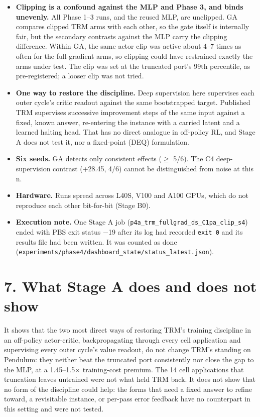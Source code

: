 \documentclass[11pt]{article}
\begin{document}
\begin{itemize}
\item \textbf{Clipping is a confound against the MLP and Phase 3, and binds unevenly.} All Phase 1--3 runs, and the reused MLP, are unclipped. GA compares clipped TRM arms with each other, so the gate itself is internally fair, but the secondary contrasts against the MLP carry the clipping difference. Within GA, the same actor clip was active about 4--7 times as often for the full-gradient arms, so clipping could have restrained exactly the arms under test. The clip was set at the truncated port's 99th percentile, as pre-registered; a looser clip was not tried.
\item \textbf{One way to restore the discipline.} Deep supervision here supervises each outer cycle's critic readout against the same bootstrapped target. Published TRM supervises successive improvement steps of the same input against a fixed, known answer, re-entering the instance with a carried latent and a learned halting head. That has no direct analogue in off-policy RL, and Stage A does not test it, nor a fixed-point (DEQ) formulation.
\item \textbf{Six seeds.} GA detects only consistent effects ($\geq$ 5/6). The C4 deep-supervision contrast (+28.45, 4/6) cannot be distinguished from noise at this n.
\item \textbf{Hardware.} Runs spread across L40S, V100 and A100 GPUs, which do not reproduce each other bit-for-bit (Stage B0).
\item \textbf{Execution note.} One Stage A job (\texttt{p4a\_\allowbreak{}trm\_\allowbreak{}fullgrad\_\allowbreak{}ds\_\allowbreak{}C1pa\_\allowbreak{}clip\_\allowbreak{}s4}) ended with PBS exit status $-$19 after its log had recorded \texttt{exit 0} and its results file had been written. It was counted as done (\texttt{experiments/\allowbreak{}phase4/\allowbreak{}dashboard\_\allowbreak{}state/\allowbreak{}status\_\allowbreak{}latest.\allowbreak{}json}).
\end{itemize}



\section*{7. What Stage A does and does not show}



It shows that the two most direct ways of restoring TRM's training discipline in an off-policy actor-critic, backpropagating through every cell application and supervising every outer cycle's value readout, do not change TRM's standing on Pendulum: they neither beat the truncated port consistently nor close the gap to the MLP, at a 1.45--1.5$\times$ training-cost premium. The 14 cell applications that truncation leaves untrained were not what held TRM back. It does not show that no form of the discipline could help: the forms that need a fixed answer to refine toward, a revisitable instance, or per-pass error feedback have no counterpart in this setting and were not tested.
\end{document}
